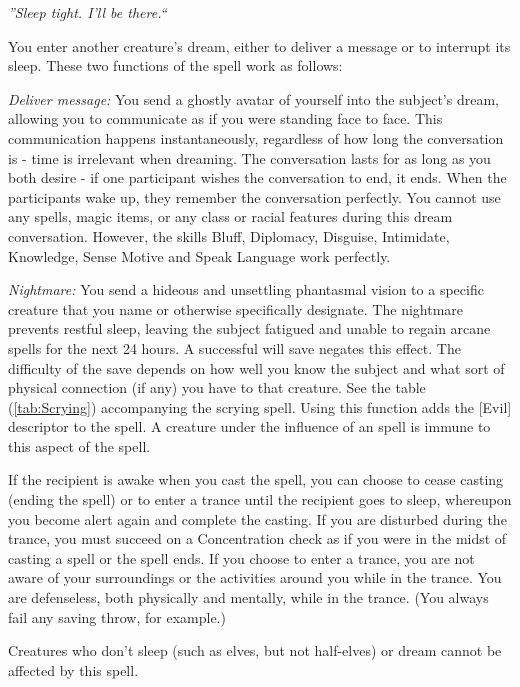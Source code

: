 \emph{''Sleep tight. I'll be there.``}

You enter another creature's dream, either to deliver a message or to interrupt its sleep. These two functions of the spell work as follows:
\begin{list}{}{\leftmargin=1em}
 \item \emph{Deliver message:} You send a ghostly avatar of yourself into the subject's dream, allowing you to communicate as if you were standing face to face.
 This communication happens instantaneously, regardless of how long the conversation is - time is irrelevant when dreaming.
 The conversation lasts for as long as you both desire - if one participant wishes the conversation to end, it ends.
 When the participants wake up, they remember the conversation perfectly.
 You cannot use any spells, magic items, or any class or racial features during this dream conversation. 
 However, the skills Bluff, Diplomacy, Disguise, Intimidate, Knowledge, Sense Motive and Speak Language work perfectly.
 \item \emph{Nightmare:} You send a hideous and unsettling phantasmal vision to a specific creature that you name or otherwise specifically designate.
 The nightmare prevents restful sleep, leaving the subject fatigued and unable to regain arcane spells for the next 24 hours. 
 A successful will save negates this effect.
 The difficulty of the save depends on how well you know the subject and what sort of physical connection (if any) you have to that creature.
 See the table (\ref{tab:Scrying}) accompanying the scrying spell.
 Using this function adds the [Evil] descriptor to the spell.
 A creature under the influence of an  spell is immune to this aspect of the spell.
\end{list}
If the recipient is awake when you cast the spell, you can choose to cease casting (ending the spell) or to enter a trance until the recipient goes to sleep, 
whereupon you become alert again and complete the casting. If you are disturbed during the trance, 
you must succeed on a Concentration check as if you were in the midst of casting a spell or the spell ends. 
If you choose to enter a trance, you are not aware of your surroundings or the activities around you while in the trance.
You are defenseless, both physically and mentally, while in the trance. (You always fail any saving throw, for example.)

Creatures who don't sleep (such as elves, but not half-elves) or dream cannot be affected by this spell. 

